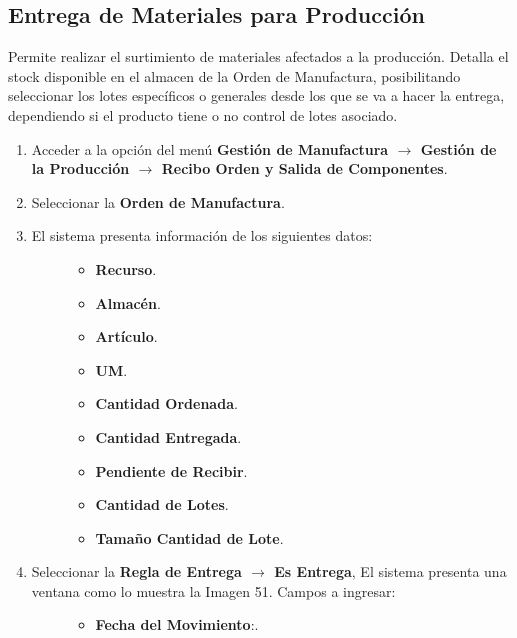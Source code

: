 \documentclass[letterpaper,10pt,spanish]{sphinxmanual}
\begin{document}
\subsection{Entrega de Materiales para Producción}
\label{manufactura-operaciones:entrega-de-materiales-para-produccion}
Permite realizar el surtimiento de materiales afectados a la producción. Detalla el stock disponible en el almacen de la Orden de Manufactura, posibilitando seleccionar los lotes específicos o generales desde los que se va a hacer la entrega, dependiendo si el producto tiene o no control de lotes asociado.
\begin{enumerate}
\item {} 
Acceder a la opción del menú \textbf{Gestión de Manufactura \(\rightarrow\)  Gestión de la Producción \(\rightarrow\) Recibo Orden y Salida de Componentes}.

\item {} 
Seleccionar la \textbf{Orden de Manufactura}.

\item {} \begin{description}
\item[{El sistema presenta información de los siguientes datos:}] \leavevmode\begin{itemize}
\item {} 
\textbf{Recurso}.

\item {} 
\textbf{Almacén}.

\item {} 
\textbf{Artículo}.

\item {} 
\textbf{UM}.

\item {} 
\textbf{Cantidad Ordenada}.

\item {} 
\textbf{Cantidad Entregada}.

\item {} 
\textbf{Pendiente de Recibir}.

\item {} 
\textbf{Cantidad de Lotes}.

\item {} 
\textbf{Tamaño Cantidad de Lote}.

\end{itemize}

\end{description}

\item {} \begin{description}
\item[{Seleccionar la \textbf{Regla de Entrega \(\rightarrow\) Es Entrega}, El sistema presenta una ventana como lo muestra la Imagen 51. Campos a ingresar:}] \leavevmode\begin{itemize}
\item {} 
\textbf{Fecha del Movimiento}:.


\end{itemize}
\end{description}
\end{enumerate}
\end{document}
